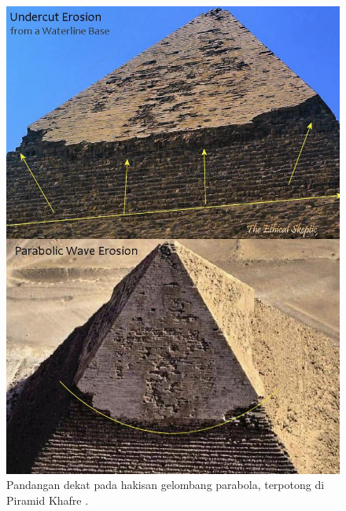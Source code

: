 \documentclass[10pt,twocolumn,letterpaper]{article}
\begin{document}
\begin{figure}[H]
\begin{center}
   \includegraphics[width=1\linewidth]{wave.jpg}
\end{center}
   \caption{Pandangan dekat pada hakisan gelombang parabola, terpotong di Piramid Khafre \cite{27}.}
\label{fig:19}
\label{fig:onecol}
\end{figure}
\end{document}
